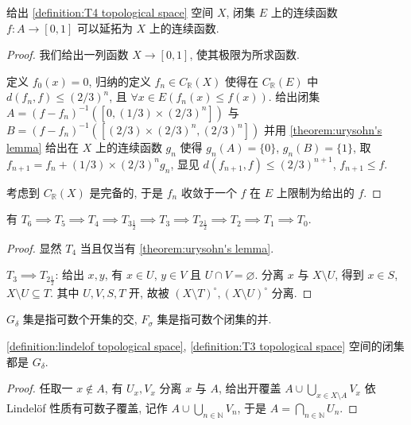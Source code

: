 \begin{theorem}[Tietze 延拓]
    \label {theorem:tietze's extension}
    给出 \ref{definition:T4 topological space} 空间 \(X\), 闭集 \(E\) 上的连续函数 \(f : A \to [0,1]\) 可以延拓为 \(X\) 上的连续函数.

    \begin{proof}
        我们给出一列函数 \(X \to [0,1]\), 使其极限为所求函数.

        定义 \(f_0 (x) = 0\), 归纳的定义 \(f_n \in C_\mathbb{R} (X)\) 使得在 \(C_\mathbb{R} (E)\) 中 \(d (f_n, f) \le (2/3)^n\), 且 \(\forall x \in E (f_n (x) \le f(x))\).
        给出闭集 \(A = {(f - f_n)}^{-1} ([0,(1/3) \times {(2/3)}^n])\) 与 \(B = {(f - f_n)}^{-1} ([(2/3) \times {(2/3)}^n,{(2/3)}^n])\) 并用 \ref{theorem:urysohn's lemma} 给出在
        \(X\) 上的连续函数 \(g_n\) 使得 \(g_n (A) = \{0\}\), \(g_n (B) = \{1\}\), 取 \(f_{n+1} = f_n + (1/3) \times (2/3)^n g_n\), 显见 \(d (f_{n+1}, f) \le (2/3)^{n+1}\), \(f_{n+1} \le f\).

        考虑到 \(C_\mathbb{R} (X)\) 是完备的, 于是 \(f_n\) 收敛于一个 \(f\) 在 \(E\) 上限制为给出的 \(f\).
    \end{proof}
\end{theorem}

\begin{lemma}
    有 \(T_6 \implies T_5 \implies T_4 \implies T_{3 \frac{1}{2}} \implies T_3 \implies T_{2 \frac{1}{2}} \implies T_2 \implies T_1 \implies T_0\).

    \begin{proof}
        显然 \(T_4\) 当且仅当有 \ref{theorem:urysohn's lemma}.

        \(T_3 \implies T_{2 \frac{1}{2}}\): 给出 \(x,y\), 有 \(x \in U\), \(y \in V\) 且 \(U \cap V = \varnothing\).
        分离 \(x\) 与 \(X \setminus U\), 得到 \(x \in S\), \(X \setminus U \subseteq T\). 其中 \(U,V,S,T\) 开, 故被 \({(X \setminus T)}^\circ,{(X \setminus U)}^\circ\) 分离.
    \end{proof}
\end{lemma}

\begin{definition}
    \(G_\delta\) 集是指可数个开集的交, \(F_\sigma\) 集是指可数个闭集的并.
\end{definition}

\begin{lemma}
    \ref{definition:lindelof topological space}, \ref{definition:T3 topological space} 空间的闭集都是 \(G_\delta\).

    \begin{proof}
        任取一 \(x \notin A\), 有 \(U_x,V_x\) 分离 \(x\) 与 \(A\), 给出开覆盖 \(A \cup \bigcup_{x \in X \setminus A} V_x\)
        依 Lindelöf 性质有可数子覆盖, 记作 \(A \cup \bigcup_{n \in \mathbb{N}} V_n\), 于是 \(A = \bigcap_{n \in \mathbb{N}} U_n\).
    \end{proof}
\end{lemma}

